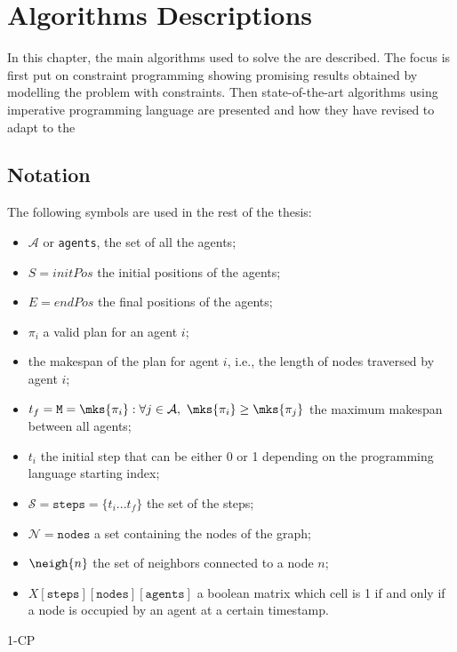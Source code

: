\chapter{Algorithms Descriptions}
\label{ch:solutions}
In this chapter, the main algorithms used to solve the  are
described. The focus is first put on constraint programming showing promising
results obtained by modelling the problem with constraints. \newline
Then state-of-the-art algorithms using imperative programming language are
presented and how they have revised to adapt to the 
%
%
%
\section{Notation}
The following symbols are used in the rest of the thesis:
\begin{itemize}
  \item $\mathcal{A}$ or \texttt{agents}, the set of all the agents;
  \item $S=initPos$ the initial positions of the agents;
  \item $E=endPos$ the final positions of the agents;
  \item $\pi_i$ a valid plan for an agent $i$;
  \item {} the makespan of the plan for agent $i$, i.e., the 
    length of nodes traversed by agent $i$;
  \item $t_f= \texttt{M}=\mks{\pi_i} : \forall j \in \mathcal{A},~
    \mks{\pi_i}\geq \mks{\pi_j}$ the maximum makespan between all agents;
  \item $t_i$ the initial step that can be either 0 or 1 depending on the
    programming language starting index;
  \item $\mathcal{S}=\texttt{steps}=\{t_i...t_f\}$ the set of the steps; 
  \item $\mathcal{N}=\texttt{nodes}$ a set containing the nodes of the graph;
  \item $\neigh{n}$ the set of neighbors connected to a node $n$;
  \item $X[\texttt{steps}][\texttt{nodes}][\texttt{agents}]$ a boolean matrix
    which cell is 1 if and only if a node is occupied by an agent at a certain
    timestamp. 
\end{itemize}

%
%
%
{1-CP}
